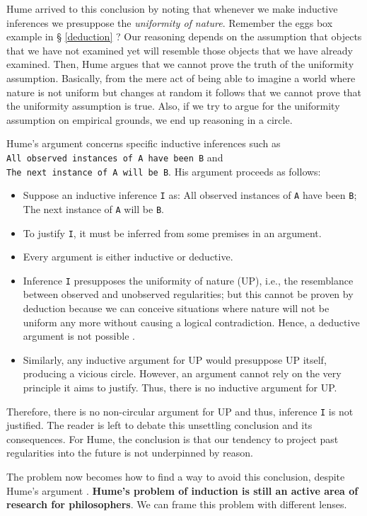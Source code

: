 \documentclass[
  12pt,
]{book}
\providecommand{\tightlist}{%
  \setlength{\itemsep}{0pt}\setlength{\parskip}{0pt}}
\begin{document}
Hume arrived to this conclusion by noting that whenever we make inductive inferences we presuppose the \emph{uniformity of nature}. Remember the eggs box example in § \ref{deduction} ? Our reasoning depends on the assumption that objects that we have not examined yet will resemble those objects that we have already examined. Then, Hume argues that we cannot prove the truth of the uniformity assumption. Basically, from the mere act of being able to imagine a world where nature is not uniform but changes at random it follows that we cannot prove that the uniformity assumption is true. Also, if we try to argue for the uniformity assumption on empirical grounds, we end up reasoning in a circle.

Hume's argument concerns specific inductive inferences such as \texttt{All\ observed\ instances\ of\ A\ have\ been\ B} and \texttt{The\ next\ instance\ of\ A\ will\ be\ B}. His argument proceeds as follows:

\begin{itemize}
\tightlist
\item
  Suppose an inductive inference \texttt{I} as: All observed instances of \texttt{A} have been \texttt{B}; The next instance of \texttt{A} will be \texttt{B}.
\item
  To justify \texttt{I}, it must be inferred from some premises in an argument.
\item
  Every argument is either inductive or deductive.
\item
  Inference \texttt{I} presupposes the uniformity of nature (UP), i.e., the resemblance between observed and unobserved regularities; but this cannot be proven by deduction because we can conceive situations where nature will not be uniform any more without causing a logical contradiction. Hence, a deductive argument is not possible \citep{sep-induction-problem}.
\item
  Similarly, any inductive argument for UP would presuppose UP itself, producing a vicious circle. However, an argument cannot rely on the very principle it aims to justify. Thus, there is no inductive argument for UP.
\end{itemize}

Therefore, there is no non-circular argument for UP and thus, inference \texttt{I} is not justified. The reader is left to debate this unsettling conclusion and its consequences. For Hume, the conclusion is that our tendency to project past regularities into the future is not underpinned by reason.

The problem now becomes how to find a way to avoid this conclusion, despite Hume's argument \citep{sep-induction-problem}. \textbf{Hume's problem of induction is still an active area of research for philosophers}. We can frame this problem with different lenses.
\end{document}
